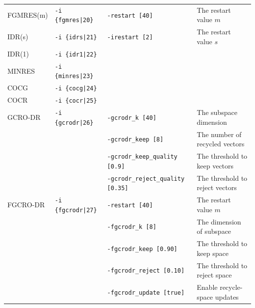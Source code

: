 \documentclass[a4paper]{article}
\begin{document}
\begin{minipage}[t]{\textwidth}
\begin{center}
\begin{tabular}{l|lll}
 FGMRES(m)   & \verb=-i {fgmres|20}=    & \verb=-restart [40]= & The restart value $m$   \\ 
 IDR(s)      & \verb=-i {idrs|21}=      & \verb=-irestart [2]= & The restart
 value $s$  \\
 IDR(1)      & \verb=-i {idr1|22}=      &    \\
 MINRES      & \verb=-i {minres|23}=    &    \\
 COCG        & \verb=-i {cocg|24}=      &    \\
 COCR        & \verb=-i {cocr|25}=      &    \\  
 GCRO-DR     & \verb=-i {gcrodr|26}=    & \verb=-gcrodr_k [40]= & The subspace dimension \\ 
             &                          & \verb=-gcrodr_keep [8]= & The number of recycled vectors \\ 
             &                          & \verb=-gcrodr_keep_quality [0.9]= & The threshold to keep vectors \\ 
 &                          & \verb=-gcrodr_reject_quality [0.35]= & The threshold to reject vectors \\   
 FGCRO-DR    & \verb=-i {fgcrodr|27}=   & \verb=-restart [40]= & The restart value $m$ \\
             &                          & \verb=-fgcrodr_k [8]= & The dimension of subspace \\
             &                          & \verb=-fgcrodr_keep [0.90]= & The threshold to keep space \\
             &                          & \verb=-fgcrodr_reject [0.10]= & The threshold to reject space \\
             &                          & \verb=-fgcrodr_update [true]= & Enable recycle-space updates \\
\hline         
\end{tabular}
\end{center}
\end{minipage}
\\ \\
\end{document}
